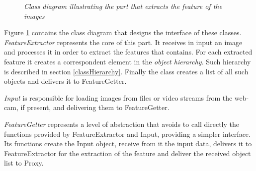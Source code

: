 	\begin{figure}[h]
	  \begin{center} 
	  \end{center} 
	  \caption{\textit{Class diagram illustrating the part that extracts the feature of the images}}  
	  \label{fig:FeatureDesign}
 	\end{figure}
	
	Figure \ref{fig:FeatureDesign} contains the class diagram that designs the interface of these classes.
	\emph{FeatureExtractor} represents the core of this part. It receives in input an image and processes it in order to extract the features that contains. For each extracted feature it creates a correspondent element in the \emph{object hierarchy}. Such hierarchy is described in section \ref{classHierarchy}. Finally the class creates a list of all such objects and delivers it to FeatureGetter. 

	\emph{Input} is responsible for loading images from files or video streams from the web-cam, if present, and delivering them to FeatureGetter. 

	\emph{FeatureGetter} represents a level of abstraction that avoids to call directly the functions provided by FeatureExtractor and Input, providing a simpler interface. Its functions create the Input object, receive from it the input data, delivers it to FeatureExtractor for the extraction of the feature and deliver the received object list to Proxy.

